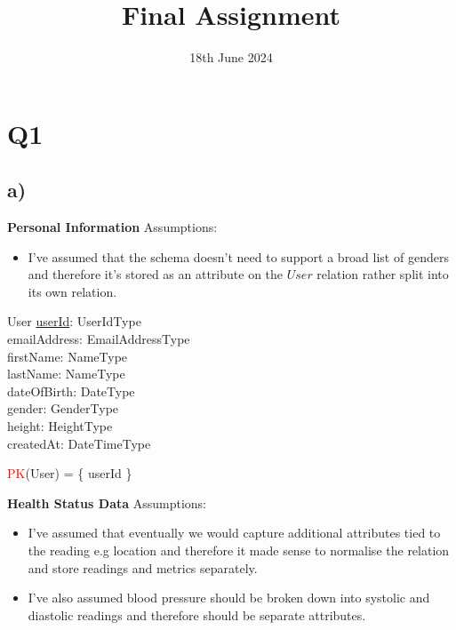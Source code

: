 \documentclass{article}
\title{Final Assignment}
\date{\vspace{-1.0cm}18th June 2024}
\begin{document}
\maketitle

\section*{Q1}

\subsection*{\small a)}
\textbf{Personal Information}
\newline \newline Assumptions:
\begin{itemize}
    \item I've assumed that the schema doesn't need to support a broad list of genders and therefore it’s stored as an attribute on the $User$ relation rather split into its own relation.
\end{itemize}
\begin{schema}{User}
	\underline{userId}: UserIdType \\
  emailAddress: EmailAddressType \\
  firstName: NameType \\
  lastName: NameType \\
  dateOfBirth: DateType \\
  gender: GenderType \\
  height: HeightType \\ 
  createdAt: DateTimeType \\
\end{schema}
\begin{zed}
\textcolor{red}{PK}(User) = \{ userId \} \\
\end{zed}
\newline
\textbf{Health Status Data}
\newline \newline Assumptions:
\begin{itemize}
  \item I've assumed that eventually we would capture additional attributes tied to the reading e.g location and therefore it made sense to normalise the relation and store readings and metrics separately.
  \item I've also assumed blood pressure should be broken down into systolic and diastolic readings and therefore should be separate attributes.
\end{itemize}
\end{document}
